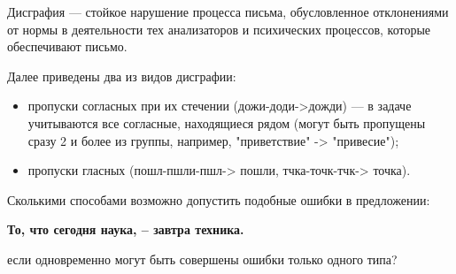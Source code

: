 
Дисграфия — стойкое нарушение процесса письма, обусловленное отклонениями от нормы в деятельности тех анализаторов и психических процессов, которые обеспечивают письмо. 

Далее приведены два из видов дисграфии:

\begin{itemize}
    \item пропуски согласных при их стечении (дожи-доди->дожди) — в задаче учитываются все согласные, находящиеся рядом (могут быть пропущены сразу 2 и более из группы, например, "приветствие" -> "привесие");
    \item пропуски гласных (пошл-пшли-пшл-> пошли, тчка-точк-тчк-> точка).
\end{itemize}

Сколькими способами возможно допустить подобные ошибки в предложении:

\begin{center}
    \textbf{То, что сегодня наука, – завтра техника.}
\end{center}

если одновременно могут быть совершены ошибки только одного типа?

